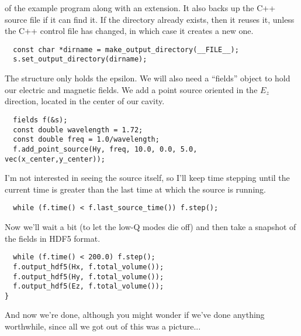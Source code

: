 of the example program along with an extension.  It also backs up the C++
source file if it can find it.  If the directory already exists, then it
reuses it, unless the C++ control file has changed, in which case it
creates a new one.
\begin{verbatim}
  const char *dirname = make_output_directory(__FILE__);
  s.set_output_directory(dirname);
\end{verbatim}
The structure only holds the epsilon.  We will also need a ``fields''
object to hold our electric and magnetic fields.  We add a point source
oriented in the $E_z$ direction, located in the center of our cavity.
\begin{verbatim}
  fields f(&s);
  const double wavelength = 1.72;
  const double freq = 1.0/wavelength;
  f.add_point_source(Hy, freq, 10.0, 0.0, 5.0, vec(x_center,y_center));
\end{verbatim}
I'm not interested in seeing the source itself, so I'll keep time stepping
until the current time is greater than the last time at which the source is
running.
\begin{verbatim}
  while (f.time() < f.last_source_time()) f.step();
\end{verbatim}
Now we'll wait a bit (to let the low-Q modes die off) and then take a
snapshot of the fields in HDF5 format.
\begin{verbatim}
  while (f.time() < 200.0) f.step();
  f.output_hdf5(Hx, f.total_volume());
  f.output_hdf5(Hy, f.total_volume());
  f.output_hdf5(Ez, f.total_volume());
}
\end{verbatim}
And now we're done, although you might wonder if we've done anything
worthwhile, since all we got out of this was a picture... 
